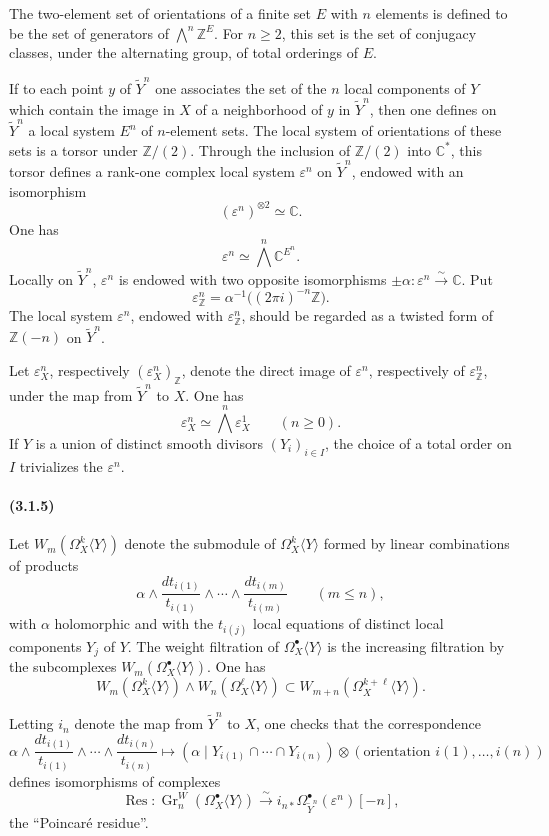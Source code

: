 \documentclass[10pt]{article}
\newcommand{\C}{\mathbb C}
\newcommand{\Z}{\mathbb Z}
\newcommand{\Gr}{\operatorname{Gr}}
\newcommand{\iso}{\xrightarrow{\sim}}
\newcommand{\Res}{\operatorname{Res}}
\begin{document}
The two-element set of orientations of a finite set $E$ with $n$ elements is defined to be the set of generators of $\bigwedge^n\Z^E$. For $n\ge2$, this set is the set of conjugacy classes, under the alternating group, of total orderings of $E$.

If to each point $y$ of $\widetilde Y^n$ one associates the set of the $n$ local components of $Y$ which contain the image in $X$ of a neighborhood of $y$ in $\widetilde Y^n$, then one defines on $\widetilde Y^n$ a local system $E^n$ of $n$-element sets. The local system of orientations of these sets is a torsor under $\Z/(2)$. Through the inclusion of $\Z/(2)$ into $\C^*$, this torsor defines a rank-one complex local system $\varepsilon^n$ on $\widetilde Y^n$, endowed with an isomorphism
\[
(\varepsilon^n)^{\otimes2}\simeq\C.
\]
One has
\[
\varepsilon^n\simeq\bigwedge^n\C^{E^n}.
\]
Locally on $\widetilde Y^n$, $\varepsilon^n$ is endowed with two opposite isomorphisms $\pm\alpha:\varepsilon^n\iso\C$. Put
\[
\varepsilon_\Z^n=\alpha^{-1}\bigl((2\pi i)^{-n}\Z\bigr).
\]
The local system $\varepsilon^n$, endowed with $\varepsilon_\Z^n$, should be regarded as a twisted form of $\Z(-n)$ on $\widetilde Y^n$.

Let $\varepsilon_X^n$, respectively $(\varepsilon_X^n)_\Z$, denote the direct image of $\varepsilon^n$, respectively of $\varepsilon_\Z^n$, under the map from $\widetilde Y^n$ to $X$. One has
\[
\tag{3.1.4.1}
\varepsilon_X^n\simeq\bigwedge^n\varepsilon_X^1\qquad(n\ge0).
\]
If $Y$ is a union of distinct smooth divisors $(Y_i)_{i\in I}$, the choice of a total order on $I$ trivializes the $\varepsilon^n$.

\paragraph{(3.1.5)} Let $W_m(\Omega_X^k\langle Y\rangle)$ denote the submodule of $\Omega_X^k\langle Y\rangle$ formed by linear combinations of products
\[
\alpha\wedge\frac{dt_{i(1)}}{t_{i(1)}}\wedge\cdots\wedge
\frac{dt_{i(m)}}{t_{i(m)}}\qquad(m\le n),
\]
with $\alpha$ holomorphic and with the $t_{i(j)}$ local equations of distinct local components $Y_j$ of $Y$. The weight filtration of $\Omega_X^\bullet\langle Y\rangle$ is the increasing filtration by the subcomplexes $W_m(\Omega_X^\bullet\langle Y\rangle)$. One has
\[
\tag{3.1.5.1}
W_m(\Omega_X^k\langle Y\rangle)\wedge W_n(\Omega_X^\ell\langle Y\rangle)
\subset W_{m+n}(\Omega_X^{k+\ell}\langle Y\rangle).
\]

Letting $i_n$ denote the map from $\widetilde Y^n$ to $X$, one checks that the correspondence
\[
\alpha\wedge\frac{dt_{i(1)}}{t_{i(1)}}\wedge\cdots\wedge
\frac{dt_{i(n)}}{t_{i(n)}}
\longmapsto
(\alpha\mid Y_{i(1)}\cap\cdots\cap Y_{i(n)})\otimes
(\text{orientation }i(1),\ldots,i(n))
\]
defines isomorphisms of complexes
\[
\tag{3.1.5.2}
\Res:\Gr_n^W(\Omega_X^\bullet\langle Y\rangle)\iso
i_{n*}\Omega_{\widetilde Y^n}^\bullet(\varepsilon^n)[-n],
\]
the ``Poincaré residue''.
\end{document}
